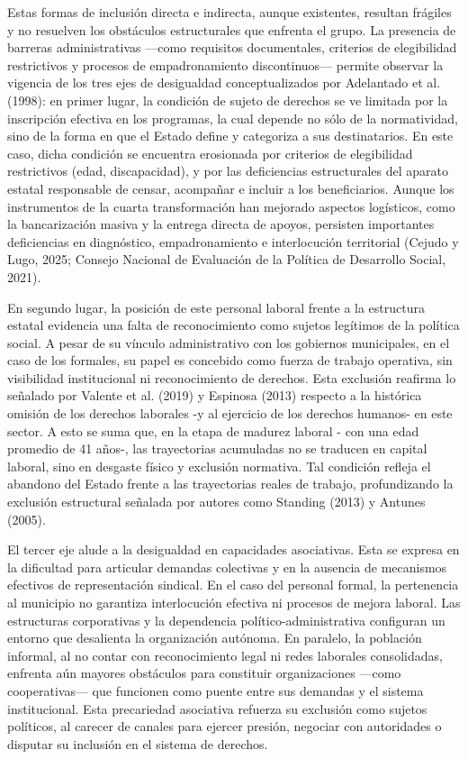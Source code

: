 \documentclass[
  spanish,
  11.5pt,
  170mm x 240mmpaper,
]{scrbook}
\begin{document}
Estas formas de inclusión directa e indirecta, aunque existentes,
resultan frágiles y no resuelven los obstáculos estructurales que
enfrenta el grupo. La presencia de barreras administrativas ---como
requisitos documentales, criterios de elegibilidad restrictivos y
procesos de empadronamiento discontinuos--- permite observar la vigencia
de los tres ejes de desigualdad conceptualizados por Adelantado et al.
(1998): en primer lugar, la condición de sujeto de derechos se ve
limitada por la inscripción efectiva en los programas, la cual depende
no sólo de la normatividad, sino de la forma en que el Estado define y
categoriza a sus destinatarios. En este caso, dicha condición se
encuentra erosionada por criterios de elegibilidad restrictivos (edad,
discapacidad), y por las deficiencias estructurales del aparato estatal
responsable de censar, acompañar e incluir a los beneficiarios. Aunque
los instrumentos de la cuarta transformación han mejorado aspectos
logísticos, como la bancarización masiva y la entrega directa de apoyos,
persisten importantes deficiencias en diagnóstico, empadronamiento e
interlocución territorial (Cejudo y Lugo, 2025; Consejo Nacional de
Evaluación de la Política de Desarrollo Social, 2021).

En segundo lugar, la posición de este personal laboral frente a la
estructura estatal evidencia una falta de reconocimiento como sujetos
legítimos de la política social. A pesar de su vínculo administrativo
con los gobiernos municipales, en el caso de los formales, su papel es
concebido como fuerza de trabajo operativa, sin visibilidad
institucional ni reconocimiento de derechos. Esta exclusión reafirma lo
señalado por Valente et al. (2019) y Espinosa (2013) respecto a la
histórica omisión de los derechos laborales -y al ejercicio de los
derechos humanos- en este sector. A esto se suma que, en la etapa de
madurez laboral - con una edad promedio de 41 años-, las trayectorias
acumuladas no se traducen en capital laboral, sino en desgaste físico y
exclusión normativa. Tal condición refleja el abandono del Estado frente
a las trayectorias reales de trabajo, profundizando la exclusión
estructural señalada por autores como Standing (2013) y Antunes (2005).

El tercer eje alude a la desigualdad en capacidades asociativas. Esta se
expresa en la dificultad para articular demandas colectivas y en la
ausencia de mecanismos efectivos de representación sindical. En el caso
del personal formal, la pertenencia al municipio no garantiza
interlocución efectiva ni procesos de mejora laboral. Las estructuras
corporativas y la dependencia político-administrativa configuran un
entorno que desalienta la organización autónoma. En paralelo, la
población informal, al no contar con reconocimiento legal ni redes
laborales consolidadas, enfrenta aún mayores obstáculos para constituir
organizaciones ---como cooperativas--- que funcionen como puente entre
sus demandas y el sistema institucional. Esta precariedad asociativa
refuerza su exclusión como sujetos políticos, al carecer de canales para
ejercer presión, negociar con autoridades o disputar su inclusión en el
sistema de derechos.
\end{document}
